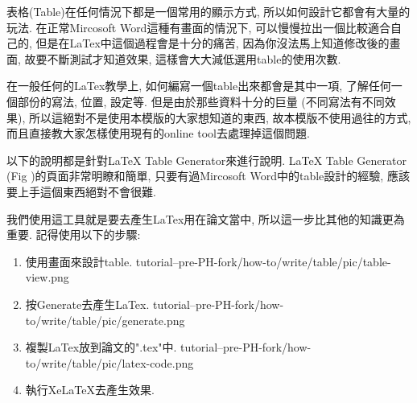 
表格(Table)在任何情況下都是一個常用的顯示方式, 所以如何設計它都會有大量的玩法. 在正常Mircosoft Word這種有畫面的情況下, 可以慢慢拉出一個比較適合自己的, 但是在LaTex中這個過程會是十分的痛苦, 因為你沒法馬上知道修改後的畫面, 故要不斷測試才知道效果, 這樣會大大減低選用table的使用次數.

在一般任何的LaTex教學上, 如何編寫一個table出來都會是其中一項, 了解任何一個部份的寫法, 位置, 設定等. 但是由於那些資料十分的巨量 (不同寫法有不同效果), 所以這絕對不是使用本模版的大家想知道的東西, 故本模版不使用過往的方式, 而且直接教大家怎樣使用現有的online tool去處理掉這個問題.

以下的說明都是針對LaTeX Table Generator來進行說明. LaTeX Table Generator (Fig )的頁面非常明瞭和簡單, 只要有過Mircosoft Word中的table設計的經驗, 應該要上手這個東西絕對不會很難.


\newpage
{}

  我們使用這工具就是要去產生LaTex用在論文當中, 所以這一步比其他的知識更為重要. 記得使用以下的步驟:

  \begin{enumerate}
  \item
  {
    使用畫面來設計table.
    \InsertFigure
      {tutorial--pre-PH-fork/how-to/write/table/pic/table-view.png}
  } %

  \item
  {
    按Generate去產生LaTex.
    \InsertFigure
      {tutorial--pre-PH-fork/how-to/write/table/pic/generate.png}
  } %

  \item
  {
    複製LaTex放到論文的".tex"中.
    \InsertFigure
      {tutorial--pre-PH-fork/how-to/write/table/pic/latex-code.png}
  } %

  \item
  {
    執行XeLaTeX去產生效果.
  } %
  \end{enumerate}

